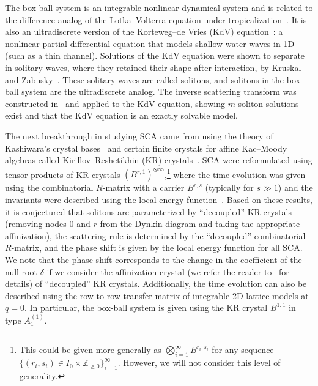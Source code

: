 \documentclass[reqno]{amsart}
\newcommand{\ZZ}{\mathbb{Z}}
\theoremstyle{plain}
\theoremstyle{definition}
\numberwithin{equation}{section}
\begin{document}
The box-ball system is an integrable nonlinear dynamical system and is related to the difference analog of the Lotka--Volterra equation under tropicalization~\cite{TNS96,TTMS96}.
It is also an ultradiscrete version of the Korteweg--de Vries (KdV) equation~\cite{Boussinesq1877, KdV1895}: a nonlinear partial differential equation that models shallow water waves in 1D (such as a thin channel).
Solutions of the KdV equation were shown to separate in solitary waves, where they retained their shape after interaction, by Kruskal and Zabusky~\cite{KZ64}.
These solitary waves are called solitons, and solitons in the box-ball system are the ultradiscrete analog.
The inverse scattering transform was constructed in~\cite{GGKM74} and applied to the KdV equation, showing $m$-soliton solutions exist and that the KdV equation is an exactly solvable model.

The next breakthrough in studying SCA came from using the theory of Kashiwara's crystal bases~\cite{K90, K91} and certain finite crystals for affine Kac--Moody algebras called Kirillov--Reshetikhin (KR) crystals~\cite{FOS09,HKOTY99,HKOTT02,JS10,KKMMNN92,KMOY07,OS08,Yamane98}.
SCA were reformulated using tensor products of KR crystals $(B^{r,1})^{\otimes \infty}$,\footnote{This could be given more generally as $\bigotimes_{i=1}^{\infty} B^{r_i,s_i}$ for any sequence $\{ (r_i, s_i) \in I_0 \times \ZZ_{\geq 0} \}_{i=1}^{\infty}$. However, we will not consider this level of generality.} where the time evolution was given using the combinatorial $R$-matrix with a carrier $B^{r,s}$ (typically for $s \gg 1$) and the invariants were described using the local energy function~\cite{binMohamad12,FOY00,HHIKTT01,HKOTY02,HKT00,MOW12,MW13,TNS96,Yamada04,Yamada07}.
Based on these results, it is conjectured that solitons are parameterized by ``decoupled'' KR crystals (removing nodes $0$ and $r$ from the Dynkin diagram and taking the appropriate affinization), the scattering rule is determined by the ``decoupled'' combinatorial $R$-matrix, and the phase shift is given by the local energy function for all SCA.
We note that the phase shift corresponds to the change in the coefficient of the null root $\delta$ if we consider the affinization crystal (we refer the reader to~\cite[Ch.~10]{HK02} for details) of ``decoupled'' KR crystals.
Additionally, the time evolution can also be described using the row-to-row transfer matrix of integrable 2D lattice models at $q = 0$.
In particular, the box-ball system is given using the KR crystal $B^{1,1}$ in type $A_1^{(1)}$.
\end{document}
